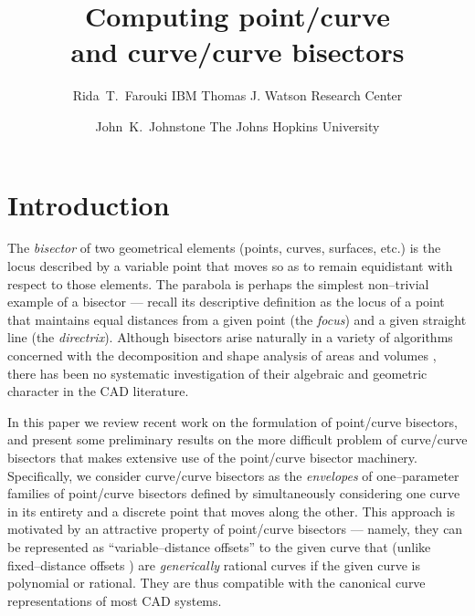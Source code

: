 
\def\rd{{\rm d}}
\def\re{{\rm e}}
\def\ri{{\rm i}}
\def\ldash{\vrule height 3pt width 0.35in depth -2.5pt}
\newcommand{\half}{\textstyle{1 \over 2}\displaystyle}
\newcommand{\prf}{\noindent{{\bf Proof} :\ }}
\newcommand{\QED}{\vrule height 1.4ex width 1.0ex depth -.1ex\ \medskip}

\newtheorem{dfn}{Definition}[section]
\newtheorem{rmk}{Remark}[section]
\newtheorem{lma}{Lemma}[section]
\newtheorem{propn}{Proposition}[section]
\newtheorem{exmpl}{Example}[section]
\newtheorem{thm}{Theorem}[section]
\newtheorem{crlry}{Corollary}[section]

\title{
Computing point/curve \\
and curve/curve bisectors
}

\author{
Rida~T.~Farouki \affil IBM Thomas J. Watson Research Center
\and
John~K.~Johnstone \affil The Johns Hopkins University
}




\maketitle

\section{Introduction}

The {\it bisector\/} of two geometrical elements (points, curves,
surfaces, etc.) is the locus described by a variable point that
moves so as to remain equidistant with respect to those elements.
The parabola is perhaps the simplest non--trivial example of a
bisector --- recall \cite{coxeter69} its descriptive definition
as the locus of a point that maintains equal distances from a
given point (the {\it focus}) and a given straight line (the
{\it directrix}). Although bisectors arise naturally in a variety
of algorithms concerned with the decomposition and shape analysis
of areas and volumes \cite{bookstein79,held91,lee82,yap87}, there
has been no systematic investigation of their algebraic and
geometric character in the CAD literature.

In this paper we review recent work \cite{farouki91b} on the
formulation of point/curve bisectors, and present some preliminary
results on the more difficult problem of curve/curve bisectors
that makes extensive use of the point/curve bisector machinery.
Specifically, we consider curve/curve bisectors as the {\it
envelopes\/} of one--parameter families of point/curve bisectors
defined by simultaneously considering one curve in its entirety
and a discrete point that moves along the other. This approach is
motivated by an attractive property of point/curve bisectors ---
namely, they can be represented as ``variable--distance offsets''
to the given curve that (unlike fixed--distance offsets \cite
{farouki90a,farouki90b}) are {\it generically\/} rational curves
if the given curve is polynomial or rational. They are thus
compatible with the canonical curve representations of most
CAD systems.

